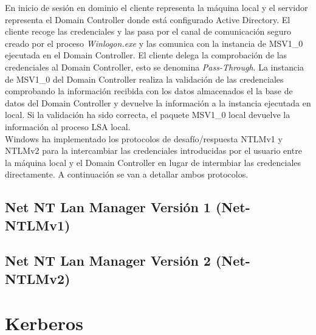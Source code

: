 En inicio de sesión en dominio el cliente representa la máquina local y el servidor representa el Domain Controller donde está configurado Active Directory. El cliente recoge las credenciales y las pasa por el canal de comunicación seguro creado por el proceso {\it Winlogon.exe} y las comunica con la instancia de MSV1\_0 ejecutada en el Domain Controller. El cliente delega la comprobación de las credenciales al Domain Controller, esto se denomina {\it Pass-Through}. La instancia de MSV1\_0 del Domain Controller realiza la validación de las credenciales comprobando la información recibida con los datos almacenados el la base de datos del Domain Controller y devuelve la información a la instancia ejecutada en local. Si la validación ha sido correcta, el paquete MSV1\_0 local devuelve la información al proceso LSA local. \\

Windows ha implementado los protocolos de desafío/respuesta NTLMv1 y NTLMv2 para la intercambiar las credenciales introducidas por el usuario entre la máquina local y el Domain Controller en lugar de intermbiar las credenciales directamente. A continuación se van a detallar ambos protocolos. 

\subsection{Net NT Lan Manager Versión 1 (Net-NTLMv1)}



\subsection{Net NT Lan Manager Versión 2 (Net-NTLMv2)}



\section{Kerberos}

